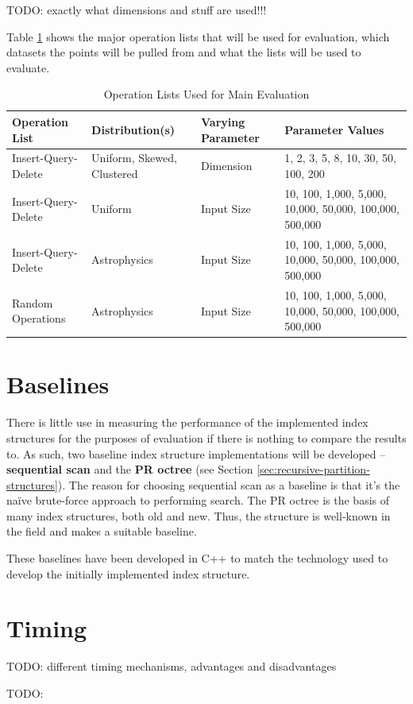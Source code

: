 TODO: exactly what dimensions and stuff are used!!!

Table \ref{tab:operation-lists} shows the major operation lists that will be used for evaluation, which datasets the points will be pulled from and what the lists will be used to evaluate.

\begin{table}
	\centering
	\begin{tabular}{|p{3.5cm}|p{3cm}|p{4cm}|p{5cm}|}
		\hline
		\textbf{Operation List} & \textbf{Distribution(s)} & \textbf{Varying Parameter} & \textbf{Parameter Values} \\
		\hline
		Insert-Query-Delete & Uniform, Skewed, Clustered & Dimension & 1, 2, 3, 5, 8, 10, 30, 50, 100, 200 \\
		Insert-Query-Delete & Uniform & Input Size & 10, 100, 1,000, 5,000, 10,000, 50,000, 100,000, 500,000 \\
		Insert-Query-Delete & Astrophysics & Input Size & 10, 100, 1,000, 5,000, 10,000, 50,000, 100,000, 500,000 \\
		Random Operations & Astrophysics & Input Size & 10, 100, 1,000, 5,000, 10,000, 50,000, 100,000, 500,000 \\
		\hline
	\end{tabular}
	\caption{Operation Lists Used for Main Evaluation}
	\label{tab:operation-lists}
\end{table}

\section{Baselines}

There is little use in measuring the performance of the implemented index structures for the purposes of evaluation if there is nothing to compare the results to. As such, two baseline index structure implementations will be developed -- \textbf{sequential scan} and the \textbf{PR octree} (see Section \ref{sec:recursive-partition-structures}). The reason for choosing sequential scan as a baseline is that it's the na\"{i}ve brute-force approach to performing search. The PR octree is the basis of many index structures, both old and new. Thus, the structure is well-known in the field and makes a suitable baseline.

These baselines have been developed in C++ to match the technology used to develop the initially implemented index structure.

\section{Timing}

TODO: different timing mechanisms, advantages and disadvantages

TODO: 